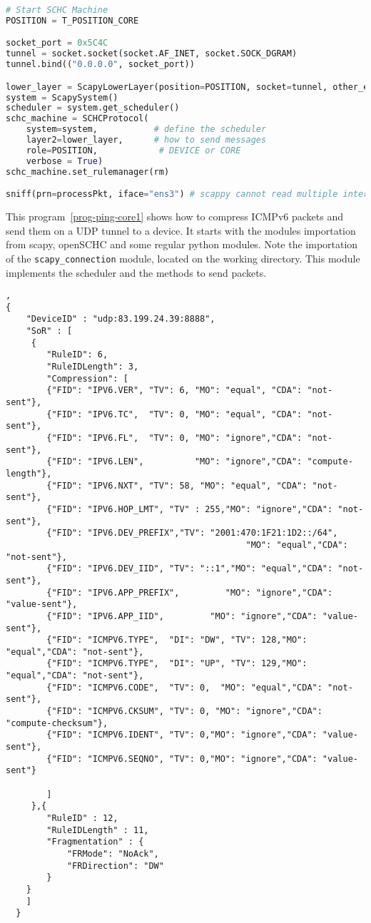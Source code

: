 \documentclass[onecolumn,12pt]{book}
\newcounter{c}
\begin{document}
\begin{lstlisting}[language=Python, basicstyle=\ttfamily\scriptsize, caption={Program ping\_core1.py}, label=prog-ping-core1]
# Start SCHC Machine
POSITION = T_POSITION_CORE

socket_port = 0x5C4C
tunnel = socket.socket(socket.AF_INET, socket.SOCK_DGRAM)
tunnel.bind(("0.0.0.0", socket_port))

lower_layer = ScapyLowerLayer(position=POSITION, socket=tunnel, other_end=None)
system = ScapySystem()
scheduler = system.get_scheduler()
schc_machine = SCHCProtocol(
    system=system,           # define the scheduler
    layer2=lower_layer,      # how to send messages
    role=POSITION,            # DEVICE or CORE
    verbose = True)           
schc_machine.set_rulemanager(rm)

sniff(prn=processPkt, iface="ens3") # scappy cannot read multiple interfaces

\end{lstlisting}

This program~\vref{prog-ping-core1} shows how to compress ICMPv6 packets and send them on a UDP tunnel to a device. It starts with the modules importation from scapy, openSCHC and some regular python modules. Note the importation of the \texttt{scapy\_connection} module, located on the working directory. This module implements the scheduler and the methods to send packets.

\begin{lstlisting}[caption={rule icmp1.json}, backgroundcolor=\color{yellow}, label=rule-icmp1, basicstyle=\ttfamily\tiny],
{
    "DeviceID" : "udp:83.199.24.39:8888",
    "SoR" : [
	 {
	    "RuleID": 6,
	    "RuleIDLength": 3,
	    "Compression": [
		{"FID": "IPV6.VER", "TV": 6, "MO": "equal", "CDA": "not-sent"},
		{"FID": "IPV6.TC",  "TV": 0, "MO": "equal", "CDA": "not-sent"},
		{"FID": "IPV6.FL",  "TV": 0, "MO": "ignore","CDA": "not-sent"},
		{"FID": "IPV6.LEN",          "MO": "ignore","CDA": "compute-length"},
		{"FID": "IPV6.NXT", "TV": 58, "MO": "equal", "CDA": "not-sent"},
		{"FID": "IPV6.HOP_LMT", "TV" : 255,"MO": "ignore","CDA": "not-sent"},
		{"FID": "IPV6.DEV_PREFIX","TV": "2001:470:1F21:1D2::/64",
                                               "MO": "equal","CDA": "not-sent"},
		{"FID": "IPV6.DEV_IID", "TV": "::1","MO": "equal","CDA": "not-sent"},
		{"FID": "IPV6.APP_PREFIX",         "MO": "ignore","CDA": "value-sent"},
		{"FID": "IPV6.APP_IID",         "MO": "ignore","CDA": "value-sent"},
		{"FID": "ICMPV6.TYPE",  "DI": "DW", "TV": 128,"MO": "equal","CDA": "not-sent"},
		{"FID": "ICMPV6.TYPE",  "DI": "UP", "TV": 129,"MO": "equal","CDA": "not-sent"},
		{"FID": "ICMPV6.CODE",  "TV": 0,  "MO": "equal","CDA": "not-sent"},
		{"FID": "ICMPV6.CKSUM", "TV": 0, "MO": "ignore","CDA": "compute-checksum"},
		{"FID": "ICMPV6.IDENT", "TV": 0,"MO": "ignore","CDA": "value-sent"},
		{"FID": "ICMPV6.SEQNO", "TV": 0,"MO": "ignore","CDA": "value-sent"}
		
	    ]
	 },{
		"RuleID" : 12,
		"RuleIDLength" : 11,
		"Fragmentation" : {
			"FRMode": "NoAck",
			"FRDirection": "DW"
		}
	} 
    ]
  }
\end{lstlisting}
\end{document}
